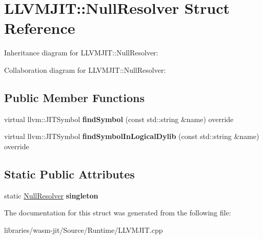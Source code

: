 \hypertarget{struct_l_l_v_m_j_i_t_1_1_null_resolver}{}\section{L\+L\+V\+M\+J\+IT\+:\+:Null\+Resolver Struct Reference}
\label{struct_l_l_v_m_j_i_t_1_1_null_resolver}


Inheritance diagram for L\+L\+V\+M\+J\+IT\+:\+:Null\+Resolver\+:


Collaboration diagram for L\+L\+V\+M\+J\+IT\+:\+:Null\+Resolver\+:
\subsection*{Public Member Functions}
\begin{DoxyCompactItemize}
\item 
\mbox{\label{struct_l_l_v_m_j_i_t_1_1_null_resolver_a9f27f7bd7c8d7fb6c6b4376807083e16}} 
virtual llvm\+::\+J\+I\+T\+Symbol {\bfseries find\+Symbol} (const std\+::string \&name) override
\item 
\mbox{\label{struct_l_l_v_m_j_i_t_1_1_null_resolver_a2c92920d62341aa33f3d8ff50eb329f7}} 
virtual llvm\+::\+J\+I\+T\+Symbol {\bfseries find\+Symbol\+In\+Logical\+Dylib} (const std\+::string \&name) override
\end{DoxyCompactItemize}
\subsection*{Static Public Attributes}
\begin{DoxyCompactItemize}
\item 
\mbox{\label{struct_l_l_v_m_j_i_t_1_1_null_resolver_a5c50d8fc813de2c413c96d0ec7b3ba9c}} 
static \mbox{\hyperlink{struct_runtime_1_1_null_resolver}{Null\+Resolver}} {\bfseries singleton}
\end{DoxyCompactItemize}


The documentation for this struct was generated from the following file\+:\begin{DoxyCompactItemize}
\item 
libraries/wasm-\/jit/\+Source/\+Runtime/L\+L\+V\+M\+J\+I\+T.\+cpp\end{DoxyCompactItemize}
